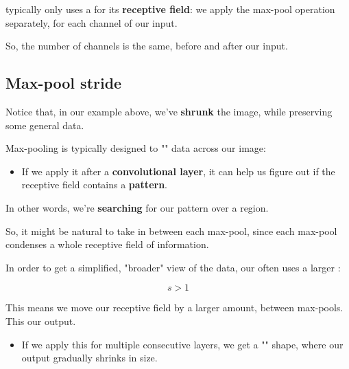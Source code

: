         \begin{concept}
             typically only uses a  for its \textbf{receptive field}: we apply the max-pool operation separately, for each channel of our input.

            So, the number of channels is the same, before and after our input.
        \end{concept}

        

    \subsection{Max-pool stride}

        Notice that, in our example above, we've \textbf{shrunk} the image, while preserving some general data.

        Max-pooling is typically designed to "" data across our image: 
            
        \begin{itemize}
            \item If we apply it after a \textbf{convolutional layer}, it can help us figure out if the receptive field contains a \textbf{pattern}.
        \end{itemize}

        In other words, we're \textbf{searching} for our pattern over a  region.

        So, it might be natural to take  in between each max-pool, since each max-pool condenses a whole receptive field of information.\\

        \begin{kequation}
            In order to get a simplified, "broader" view of the data, our  often uses a larger :

            \begin{equation*}
                s>1
            \end{equation*}
            
            This means we move our receptive field by a larger amount, between max-pools. This  our output.

            \begin{itemize}
                \item If we apply this for multiple consecutive layers, we get a "" shape, where our output gradually shrinks in size.
            \end{itemize}
        \end{kequation}

